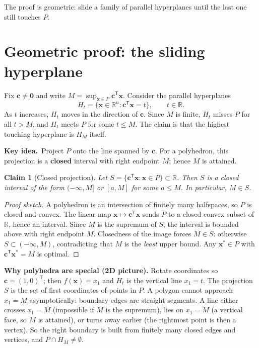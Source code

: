 \documentclass[11pt,a4paper]{article}
\newtheorem{claim}{Claim}
\newcommand{\keyidea}[1]{\medskip\noindent\textbf{Key idea.}\ #1\medskip}
\begin{document}
The proof is geometric: slide a family of parallel hyperplanes until the last one still touches $P$.

\section{Geometric proof: the sliding hyperplane}

Fix $\mathbf{c}\neq\mathbf{0}$ and write $M=\sup_{\mathbf{x}\in P}\mathbf{c}^{\mathsf T}\mathbf{x}$.
Consider the parallel hyperplanes
\[
  H_t = \{\mathbf{x}\in\mathbb{R}^n : \mathbf{c}^{\mathsf T}\mathbf{x}=t\},
  \qquad t\in\mathbb{R}.
\]
As $t$ increases, $H_t$ moves in the direction of $\mathbf{c}$.
Since $M$ is finite, $H_t$ misses $P$ for all $t>M$, and $H_t$ meets $P$ for some $t\le M$.
The claim is that the highest touching hyperplane is $H_M$ itself.

\keyidea{Project $P$ onto the line spanned by $\mathbf{c}$.
For a polyhedron, this projection is a \textbf{closed} interval with right endpoint $M$;
hence $M$ is attained.}

\begin{claim}[Closed projection]
Let $S=\{\mathbf{c}^{\mathsf T}\mathbf{x}:\mathbf{x}\in P\}\subset\mathbb{R}$.
Then $S$ is a closed interval of the form $(-\infty,M]$ or $[a,M]$ for some $a\le M$.
In particular, $M\in S$.
\end{claim}

\begin{proof}[Proof sketch]
A polyhedron is an intersection of finitely many halfspaces, so $P$ is closed and convex.
The linear map $\mathbf{x}\mapsto\mathbf{c}^{\mathsf T}\mathbf{x}$ sends $P$ to a closed convex subset of
$\mathbb{R}$, hence an interval.
Since $M$ is the supremum of $S$, the interval is bounded above with right endpoint $M$.
Closedness of the image forces $M\in S$: otherwise $S\subset(-\infty,M)$, contradicting that $M$ is the
\emph{least} upper bound.
Any $\mathbf{x}^*\in P$ with $\mathbf{c}^{\mathsf T}\mathbf{x}^*=M$ is optimal.
\end{proof}

\textbf{Why polyhedra are special (2D picture).}
Rotate coordinates so $\mathbf{c}=(1,0)^{\mathsf T}$; then $f(\mathbf{x})=x_1$ and $H_t$ is the vertical line
$x_1=t$.
The projection $S$ is the set of first coordinates of points in $P$.
A polygon cannot approach $x_1=M$ asymptotically: boundary edges are straight segments.
A line either crosses $x_1=M$ (impossible if $M$ is the supremum), lies on $x_1=M$ (a vertical face, so $M$
is attained), or turns away earlier (the rightmost point is then a vertex).
So the right boundary is built from finitely many closed edges and vertices, and $P\cap H_M\neq\emptyset$.
\end{document}
